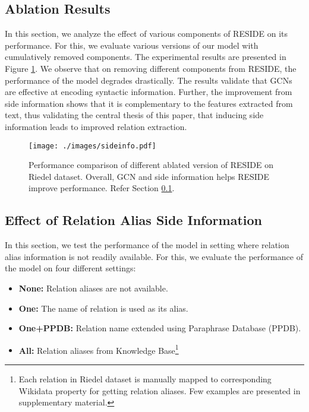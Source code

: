 \documentclass[11pt,a4paper]{article}
\newcommand{\reffig}[1]{Figure \ref{#1}}
\newcommand{\refsec}[1]{Section \ref{#1}}
\newcommand{\method}{RESIDE}
\begin{document}
\subsection{Ablation Results}
\label{sec:results_sideinfo}
In this section, we analyze the effect of various components of \method{} on its performance. For this, we evaluate various versions of our model with cumulatively removed components. The experimental results are presented in \reffig{fig:ablation}. We observe that on removing different components from \method{}, the performance of the model degrades drastically. The results validate that GCNs are effective at encoding syntactic information. Further, the improvement from side information shows that it is complementary to the features extracted from text, thus validating the central thesis of this paper, that inducing side information leads to improved relation extraction. 

\begin{figure}[t]
	\centering
	\texttt{[image: ./images/sideinfo.pdf]}
	\caption{\label{fig:ablation}Performance comparison of different ablated version of \method{} on Riedel dataset. Overall, GCN and side information helps \method{} improve performance. Refer \refsec{sec:results_sideinfo}.}
\end{figure}


\subsection{Effect of Relation Alias Side Information}
\label{sec:results_rel_side}
In this section, we test the performance of the model in setting where relation alias information is not readily available. For this, we evaluate the performance of the model on four different settings:

\begin{itemize}[itemsep=2pt,topsep=2pt,parsep=0pt,partopsep=0pt,leftmargin=*]
	\item \textbf{None:} Relation aliases are not available.
	\item \textbf{One:} The name of relation is used as its alias. 
	\item \textbf{One+PPDB:} Relation name extended using Paraphrase Database (PPDB). 
	\item \textbf{All:} Relation aliases from Knowledge Base\footnote{Each relation in Riedel dataset is manually mapped to corresponding Wikidata property for getting relation aliases. Few examples are presented in supplementary material.}

\end{itemize}
\end{document}

